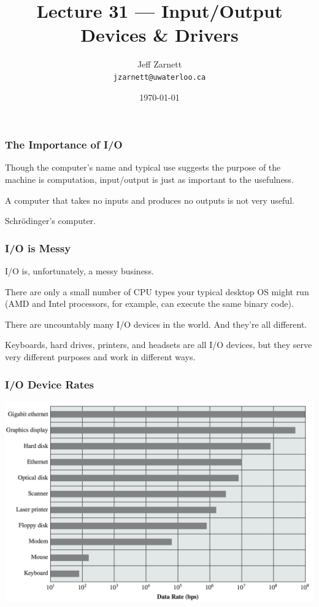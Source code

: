 

\title{Lecture 31 --- Input/Output Devices \& Drivers }

\author{Jeff Zarnett \\ \small \texttt{jzarnett@uwaterloo.ca}}
\date{\today}




\begin{frame}
  \titlepage

 \end{frame}




\begin{frame}
\frametitle{The Importance of I/O}

Though the computer's name and typical use suggests the purpose of the machine is computation, input/output is just as important to the usefulness. 

A computer that takes no inputs and produces no outputs is not very useful.

Schr\"odinger's computer.


\end{frame}

\begin{frame}
\frametitle{I/O is Messy}

I/O is, unfortunately, a messy business. 

There are only a small number of CPU types your typical desktop OS might run (AMD and Intel processors, for example, can execute the same binary code).

There are uncountably many I/O devices in the world. And they're all different. 

Keyboards, hard drives, printers, and headsets are all I/O devices, but they serve very different purposes and work in different ways.


\end{frame}

\begin{frame}
\frametitle{I/O Device Rates}

\begin{center}
	\includegraphics[width=\textwidth]{images/io-device-rates.png}
\end{center}


\end{frame}

